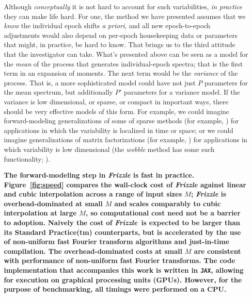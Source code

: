\documentclass[modern, linenumbers]{aastex631}
\newcommand{\name}{\textsl{Frizzle}}
\newcommand{\modified}[1]{\textcolor{Emerald}{\textbf{#1}}}
\begin{document}
Although \emph{conceptually} it is not hard to account for such variabilities, \emph{in practice} they can make life hard.
For one, the method we have presented assumes that we \emph{know} the individual epoch shifts \textsl{a priori}, and all new epoch-to-epoch adjustments would also depend on per-epoch housekeeping data or parameters that might, in practice, be hard to know.
That brings us to the third attitude that the investigator can take.
What's presented above can be seen as a model for the \emph{mean} of the process that generates individual-epoch spectra; that is the first term in an expansion of moments.
The next term would be the \emph{variance} of the process.
That is, a more sophisticated model could have not just $P$ parameters for the mean spectrum, but additionally $P'$ parameters for a variance model.
If the variance is low dimensional, or sparse, or compact in important ways, there should be very effective models of this form.
For example, we could imagine forward-modeling generalizations of some of sparse methods (for example, \citealt{candes}) for applications in which the variability is localized in time or space; or we could imagine generalizations of matrix factorizations (for example, \citealt{hmf}) for applications in which variability is low dimensional (the \textsl{wobble} method has some such functionality; \citealt{wobble}).

\modified{The forward-modeling step in \name{} is fast in practice. Figure~\ref{fig:speed} compares the wall-clock cost of \name{} against linear and cubic interpolation across a range of input sizes $M$; \name{} is overhead-dominated at small $M$ and scales comparably to cubic interpolation at large $M$, so computational cost need not be a barrier to adoption. Naively the cost of \name\ is expected to be larger than its Standard Practice(tm) counterparts, but is accelerated by the use of non-uniform fast Fourier transform algorithms and just-in-time compilation. The overhead-dominated costs at small $M$ are consistent with performance of non-uniform fast Fourier transforms. The code implementation that accompanies this work is written in \texttt{JAX}, allowing for execution on graphical processing units (GPUs). However, for the purpose of benchmarking, all timings were performed on a CPU.}
\end{document}
